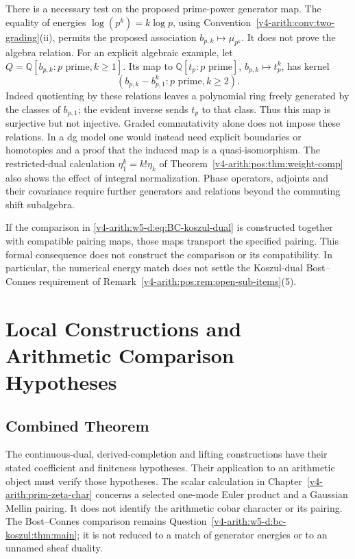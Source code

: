 There is a necessary test on the proposed prime-power generator map.
The equality of energies \(\log(p^k)=k\log p\), using
Convention~\ref{v4-arith:conv:two-grading}(ii), permits the proposed association
\(b_{p,k}\mapsto\mu_{p^k}\). It does not prove the algebra relation.
For an explicit algebraic example, let
\(Q=\mathbb Q[b_{p,k}:p\text{ prime},k\ge1]\). Its map to
\(\mathbb Q[t_p:p\text{ prime}]\), \(b_{p,k}\mapsto t_p^k\), has kernel
\[
 (b_{p,k}-b_{p,1}^k:p\text{ prime},k\ge2).
\]
Indeed quotienting by these relations leaves a polynomial ring freely
generated by the classes of \(b_{p,1}\); the evident inverse sends
\(t_p\) to that class. Thus this map is surjective but not injective.
Graded commutativity alone does not impose these relations. In a dg
model one would instead need explicit boundaries or homotopies and a
proof that the induced map is a quasi-isomorphism. The restricted-dual
calculation \(\eta_1^k=k!\eta_k\) of
Theorem~\ref{v4-arith:pos:thm:weight-comp} also shows the effect of integral
normalization. Phase operators, adjoints and their covariance require
further generators and relations beyond the commuting shift subalgebra.

\begin{remark}
\label{v4-arith:w5-d:bc-koszul:cor:subitem-5}
If the comparison in \eqref{v4-arith:w5-d:eq:BC-koszul-dual} is
constructed together with compatible pairing maps, those maps transport
the specified pairing. This formal consequence does not construct the
comparison or its compatibility. In particular, the numerical energy
match does not settle the Koszul-dual Bost--Connes requirement of
Remark~\ref{v4-arith:pos:rem:open-sub-items}(5).
\end{remark}

\section{Local Constructions and Arithmetic Comparison Hypotheses}
\label{v4-arith:w5-d:sec:combined-theorem}

\subsection{Combined Theorem}
\label{v4-arith:w5-d:combined:theorem}

\begin{remark}
\label{v4-arith:w5-d:combined:thm:four-subitems}
The continuous-dual, derived-completion and lifting constructions have
their stated coefficient and finiteness hypotheses. Their application
to an arithmetic object must verify those hypotheses. The scalar
calculation in Chapter~\ref{v4-arith:prim-zeta-char} concerns a selected
one-mode Euler product and a Gaussian Mellin pairing. It does not
identify the arithmetic cobar character or its pairing. The
Bost--Connes comparison remains
Question~\ref{v4-arith:w5-d:bc-koszul:thm:main}; it is not reduced to a match of
generator energies or to an unnamed sheaf duality.
\end{remark}

